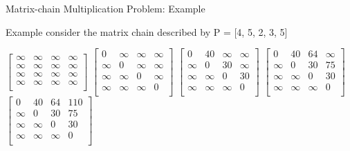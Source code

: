 \begin{frame}{Matrix-chain Multiplication Problem: Example}
  \begin{exampleblock}{Example}
    consider the matrix chain described by P = [4, 5, 2, 3, 5]
  \end{exampleblock}

  \vspace{0.5em}

  $
    \begin{bmatrix}
      \infty & \infty & \infty & \infty \\
      \infty & \infty & \infty & \infty \\
      \infty & \infty & \infty & \infty \\
      \infty & \infty & \infty & \infty \\
    \end{bmatrix}
  $
  \pause
  $
    \begin{bmatrix}
      0 & \infty & \infty & \infty \\
      \infty & 0 & \infty & \infty \\
      \infty & \infty & 0 & \infty \\
      \infty & \infty & \infty & 0 \\
    \end{bmatrix}
  $
  \pause
   $
    \begin{bmatrix}
      0 & 40 & \infty & \infty \\
      \infty & 0 & 30  & \infty \\
      \infty & \infty & 0 & 30 \\
      \infty & \infty & \infty & 0 \\
    \end{bmatrix}
  $
  \pause
  $
    \begin{bmatrix}
      0 & 40 & 64 & \infty \\
      \infty & 0 & 30  & 75 \\
      \infty & \infty & 0 & 30 \\
      \infty & \infty & \infty & 0 \\
    \end{bmatrix}
  $
  \pause
   $
    \begin{bmatrix}
      0 & 40 & 64 & 110 \\
      \infty & 0 & 30  & 75 \\
      \infty & \infty & 0 & 30 \\
      \infty & \infty & \infty & 0 \\
    \end{bmatrix}
  $
\end{frame}


